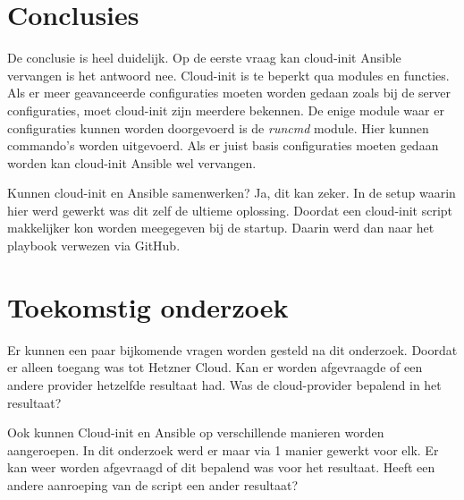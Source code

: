 \documentclass[a0,portrait]{a0poster}
\begin{document}
\begin{multicols}{2}



\color{HoGentAccent1} 
\section*{Conclusies}
\color{black}
De conclusie is heel duidelijk. Op de eerste vraag kan cloud-init Ansible vervangen is het antwoord nee. Cloud-init is te beperkt qua modules en functies. Als er meer geavanceerde configuraties moeten worden gedaan zoals bij de server configuraties, moet cloud-init zijn meerdere bekennen. De enige module waar er configuraties kunnen worden doorgevoerd is de \textit{runcmd} module. Hier kunnen commando's worden uitgevoerd. Als er juist basis configuraties moeten gedaan worden kan cloud-init Ansible wel vervangen.

Kunnen cloud-init en Ansible samenwerken? Ja, dit kan zeker. In de setup waarin hier werd gewerkt was dit zelf de ultieme oplossing. Doordat een cloud-init script makkelijker kon worden meegegeven bij de startup. Daarin werd dan naar het playbook verwezen via GitHub.

\color{HoGentAccent1} 
\section*{Toekomstig onderzoek}
\color{black}
Er kunnen een paar bijkomende vragen worden gesteld na dit onderzoek. Doordat er alleen toegang was tot Hetzner Cloud. Kan er worden afgevraagde of een andere provider hetzelfde resultaat had. Was de cloud-provider bepalend in het resultaat? 

Ook kunnen Cloud-init en Ansible op verschillende manieren worden aangeroepen. In dit onderzoek werd er maar via 1 manier gewerkt voor elk. Er kan weer worden afgevraagd of dit bepalend was voor het resultaat. Heeft een andere aanroeping van de script een ander resultaat?



\end{multicols}
\end{document}
